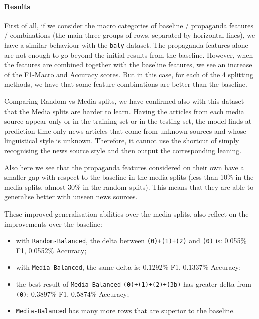 \paragraph{Results}

First of all, if we consider the macro categories of baseline / propaganda features / combinations (the main three groups of rows, separated by horizontal lines), we have a similar behaviour with the \texttt{baly} dataset. The propaganda features alone are not enough to go beyond the initial results from the baseline. However, when the features are combined together with the baseline features, we see an increase of the F1-Macro and Accuracy scores.
But in this case, for each of the 4 splitting methods, we have that some feature combinations are better than the baseline.

Comparing Random vs Media splits, we have confirmed also with this dataset that the Media splits are harder to learn. Having the articles from each media source appear only or in the training set or in the testing set, the model finds at prediction time only news articles that come from unknown sources and whose linguistical style is unknown. Therefore, it cannot use the shortcut of simply recognising the news source style and then output the corresponding leaning.

Also here we see that the propaganda features considered on their own have a smaller gap with respect to the baseline in the media splits (less than 10\% in the media splits, almost 30\% in the random splits).
This means that they are able to generalise better with unseen news sources.

These improved generalisation abilities over the media splits, also reflect on the improvements over the baseline:
\begin{itemize}
    \item with \texttt{Random-Balanced}, the delta between \texttt{(0)+(1)+(2)} and \texttt{(0)} is: 0.055\% F1, 0.0552\% Accuracy;
    \item with \texttt{Media-Balanced}, the same delta is: 0.1292\% F1, 0.1337\% Accuracy;
    \item the best result of \texttt{Media-Balanced} \texttt{(0)+(1)+(2)+(3b)} has greater delta from \texttt{(0)}: 0.3897\% F1, 0.5874\% Accuracy;
    \item \texttt{Media-Balanced} has many more rows that are superior to the baseline.
\end{itemize}

